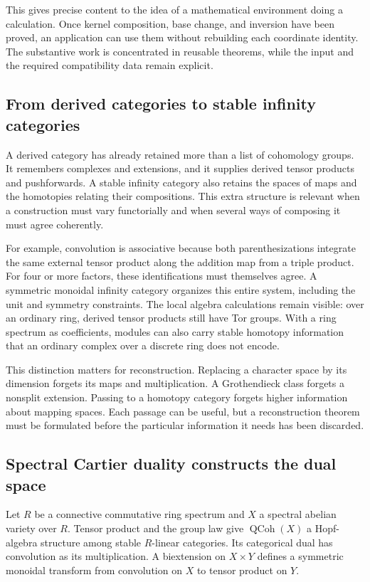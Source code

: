 \documentclass[11pt]{article}
\theoremstyle{remark}
\begin{document}
This gives precise content to the idea of a mathematical environment doing a calculation. Once kernel composition, base change, and inversion have been proved, an application can use them without rebuilding each coordinate identity. The substantive work is concentrated in reusable theorems, while the input and the required compatibility data remain explicit.

\subsection{From derived categories to stable infinity categories}

A derived category has already retained more than a list of cohomology groups. It remembers complexes and extensions, and it supplies derived tensor products and pushforwards. A stable infinity category also retains the spaces of maps and the homotopies relating their compositions. This extra structure is relevant when a construction must vary functorially and when several ways of composing it must agree coherently.

For example, convolution is associative because both parenthesizations integrate the same external tensor product along the addition map from a triple product. For four or more factors, these identifications must themselves agree. A symmetric monoidal infinity category organizes this entire system, including the unit and symmetry constraints. The local algebra calculations remain visible: over an ordinary ring, derived tensor products still have Tor groups. With a ring spectrum as coefficients, modules can also carry stable homotopy information that an ordinary complex over a discrete ring does not encode.

This distinction matters for reconstruction. Replacing a character space by its dimension forgets its maps and multiplication. A Grothendieck class forgets a nonsplit extension. Passing to a homotopy category forgets higher information about mapping spaces. Each passage can be useful, but a reconstruction theorem must be formulated before the particular information it needs has been discarded.

\subsection{Spectral Cartier duality constructs the dual space}

Let \(R\) be a connective commutative ring spectrum and \(X\) a spectral abelian variety over \(R\). Tensor product and the group law give \(\operatorname{QCoh}(X)\) a Hopf-algebra structure among stable \(R\)-linear categories. Its categorical dual has convolution as its multiplication. A biextension on \(X\times Y\) defines a symmetric monoidal transform from convolution on \(X\) to tensor product on \(Y\).
\end{document}
